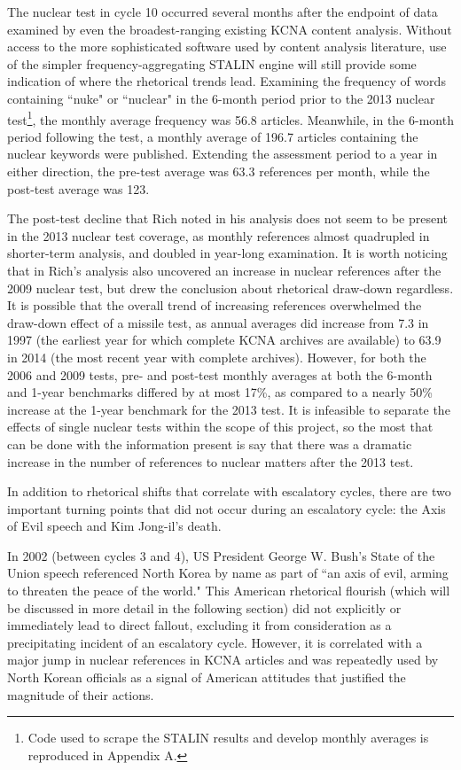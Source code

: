 \documentclass{article}
\begin{document}
The nuclear test in cycle 10 occurred several months after the endpoint of data examined by even the broadest-ranging existing KCNA content analysis\cite{rich14}. Without access to the more sophisticated software used by content analysis literature, use of the simpler frequency-aggregating STALIN engine will still provide some indication of where the rhetorical trends lead. Examining the frequency of words containing ``nuke" or ``nuclear" in the 6-month period prior to the 2013 nuclear test\footnote{Code used to scrape the STALIN results and develop monthly averages is reproduced in Appendix A.}, the monthly average frequency was 56.8 articles. Meanwhile, in the 6-month period following the test, a monthly average of 196.7 articles containing the nuclear keywords were published. Extending the assessment period to a year in either direction, the pre-test average was 63.3 references per month, while the post-test average was 123.

The post-test decline that Rich\cite{rich14} noted in his analysis does not seem to be present in the 2013 nuclear test coverage, as monthly references almost quadrupled in shorter-term analysis, and doubled in year-long examination. It is worth noticing that in Rich's analysis also uncovered an increase in nuclear references after the 2009 nuclear test, but drew the conclusion about rhetorical draw-down regardless. It is possible that the overall trend of increasing references overwhelmed the draw-down effect of a missile test, as annual averages did increase from 7.3 in 1997 (the earliest year for which complete KCNA archives are available) to 63.9 in 2014 (the most recent year with complete archives). However, for both the 2006 and 2009 tests, pre- and post-test monthly averages at both the 6-month and 1-year benchmarks differed by at most 17\%, as compared to a nearly 50\% increase at the 1-year benchmark for the 2013 test. It is infeasible to separate the effects of single nuclear tests within the scope of this project, so the most that can be done with the information present is say that there was a dramatic increase in the number of references to nuclear matters after the 2013 test.

In addition to rhetorical shifts that correlate with escalatory cycles, there are two important turning points that did not occur during an escalatory cycle: the Axis of Evil speech and Kim Jong-il's death.

In 2002 (between cycles 3 and 4), US President George W. Bush's State of the Union speech referenced North Korea by name as part of ``an axis of evil, arming to threaten the peace of the world."\cite{sotu02} This American rhetorical flourish (which will be discussed in more detail in the following section) did not explicitly or immediately lead to direct fallout, excluding it from consideration as a precipitating incident of an escalatory cycle. However, it is correlated with a major jump in nuclear references in KCNA articles \cite{rich14} and was repeatedly used by North Korean officials as a signal of American attitudes that justified the magnitude of their actions\cite{bleiker}.
\end{document}
